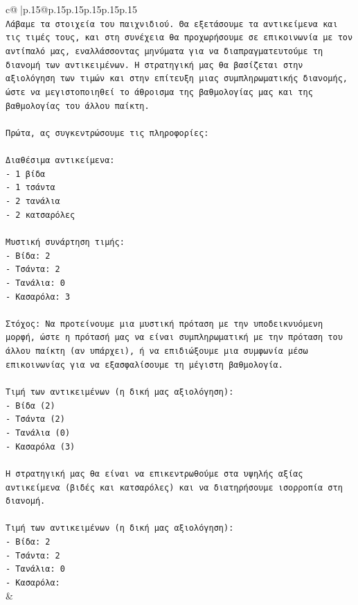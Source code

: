 \documentclass{article}
\begin{document}
{\begin{supertabular}{c@{$\;$}|p{.15\linewidth}@{}p{.15\linewidth}p{.15\linewidth}p{.15\linewidth}p{.15\linewidth}p{.15\linewidth}}
{{{\\ 
\texttt{Λάβαμε τα στοιχεία του παιχνιδιού. Θα εξετάσουμε τα αντικείμενα και τις τιμές τους, και στη συνέχεια θα προχωρήσουμε σε επικοινωνία με τον αντίπαλό μας, εναλλάσσοντας μηνύματα για να διαπραγματευτούμε τη διανομή των αντικειμένων. Η στρατηγική μας θα βασίζεται στην αξιολόγηση των τιμών και στην επίτευξη μιας συμπληρωματικής διανομής, ώστε να μεγιστοποιηθεί το άθροισμα της βαθμολογίας μας και της βαθμολογίας του άλλου παίκτη.} \\
\\ 
\texttt{Πρώτα, ας συγκεντρώσουμε τις πληροφορίες:} \\
\\ 
\texttt{Διαθέσιμα αντικείμενα:} \\
\texttt{{-} 1 βίδα} \\
\texttt{{-} 1 τσάντα} \\
\texttt{{-} 2 τανάλια} \\
\texttt{{-} 2 κατσαρόλες} \\
\\ 
\texttt{Μυστική συνάρτηση τιμής:} \\
\texttt{{-} Βίδα: 2} \\
\texttt{{-} Τσάντα: 2} \\
\texttt{{-} Τανάλια: 0} \\
\texttt{{-} Κασαρόλα: 3} \\
\\ 
\texttt{Στόχος: Να προτείνουμε μια μυστική πρόταση με την υποδεικνυόμενη μορφή, ώστε η πρότασή μας να είναι συμπληρωματική με την πρόταση του άλλου παίκτη (αν υπάρχει), ή να επιδιώξουμε μια συμφωνία μέσω επικοινωνίας για να εξασφαλίσουμε τη μέγιστη βαθμολογία.} \\
\\ 
\texttt{Τιμή των αντικειμένων (η δική μας αξιολόγηση):} \\
\texttt{{-} Βίδα (2)} \\
\texttt{{-} Τσάντα (2)} \\
\texttt{{-} Τανάλια (0)} \\
\texttt{{-} Κασαρόλα (3)} \\
\\ 
\texttt{Η στρατηγική μας θα είναι να επικεντρωθούμε στα υψηλής αξίας αντικείμενα (βιδές και κατσαρόλες) και να διατηρήσουμε ισορροπία στη διανομή.} \\
\\ 
\texttt{Τιμή των αντικειμένων (η δική μας αξιολόγηση):} \\
\texttt{{-} Βίδα: 2} \\
\texttt{{-} Τσάντα: 2} \\
\texttt{{-} Τανάλια: 0} \\
\texttt{{-} Κασαρόλα:} \\
            }
        }
    }
    & \\ \\


\end{supertabular}}
\end{document}
